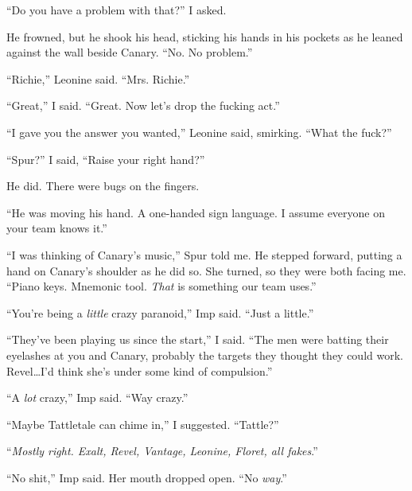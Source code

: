 ``Do you have a problem with that?''  I asked.



He frowned, but he shook his head, sticking his hands in his pockets as he leaned against the wall beside Canary.  ``No.  No problem.''



``Richie,'' Leonine said.  ``Mrs. Richie.''



``Great,'' I said.  ``Great.  Now let's drop the fucking act.''



``I gave you the answer you wanted,'' Leonine said, smirking.  ``What the fuck?''



``Spur?'' I said, ``Raise your right hand?''



He did.  There were bugs on the fingers.



``He was moving his hand.  A one-handed sign language.  I assume everyone on your team knows it.''



``I was thinking of Canary's music,'' Spur told me.  He stepped forward, putting a hand on Canary's shoulder as he did so.  She turned, so they were both facing me.  ``Piano keys.  Mnemonic tool.  \emph{That} is something our team uses.''



``You're being a \emph{little} crazy paranoid,'' Imp said.  ``Just a little.''



``They've been playing us since the start,'' I said.  ``The men were batting their eyelashes at you and Canary, probably the targets they thought they could work.  Revel\ldots I'd think she's under some kind of compulsion.''



``A \emph{lot} crazy,'' Imp said.  ``Way crazy.''



``Maybe Tattletale can chime in,'' I suggested.  ``Tattle?''



``\emph{Mostly right.  Exalt, Revel, Vantage, Leonine, Floret, all fakes}.''



``No shit,'' Imp said.  Her mouth dropped open.  ``No \emph{way}.''



